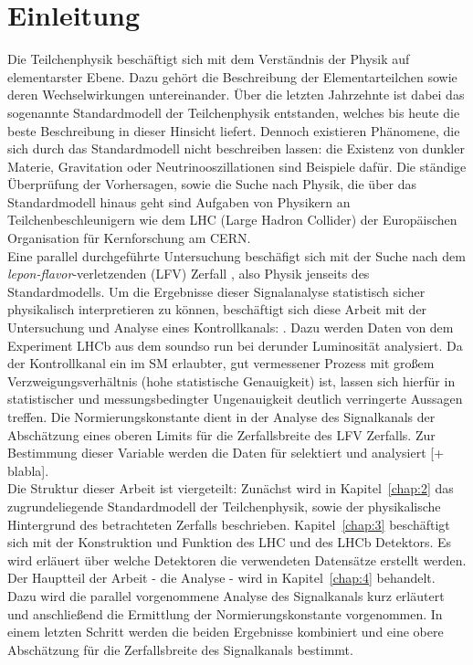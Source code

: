\chapter{Einleitung}

Die Teilchenphysik beschäftigt sich mit dem Verständnis der Physik auf elementarster Ebene. Dazu gehört die Beschreibung der Elementarteilchen sowie deren Wechselwirkungen untereinander. Über die letzten Jahrzehnte ist dabei das sogenannte Standardmodell der Teilchenphysik entstanden, welches bis heute die beste Beschreibung in dieser Hinsicht liefert. Dennoch existieren Phänomene, die sich durch das Standardmodell nicht beschreiben lassen: die Existenz von dunkler Materie, Gravitation oder Neutrinooszillationen sind Beispiele dafür. Die ständige Überprüfung der Vorhersagen, sowie die Suche nach Physik, die über das Standardmodell hinaus geht sind Aufgaben von Physikern an Teilchenbeschleunigern wie dem LHC (Large Hadron Collider) der Europäischen Organisation für Kernforschung am CERN. \\
Eine parallel durchgeführte Untersuchung beschäfigt sich mit der Suche nach dem \textit{lepon-flavor}-verletzenden (LFV) Zerfall \signal, also Physik jenseits des Standardmodells\cite{ba-maik}. Um die Ergebnisse dieser Signalanalyse statistisch sicher physikalisch interpretieren zu können, beschäftigt sich diese Arbeit mit der Untersuchung und Analyse eines Kontrollkanals: \kontroll.
Dazu werden Daten von dem Experiment LHCb aus dem soundso run bei derunder Luminosität analysiert. Da der Kontrollkanal ein im SM erlaubter, gut vermessener Prozess mit großem Verzweigungsverhältnis (hohe statistische Genauigkeit) ist, lassen sich hierfür in statistischer und messungsbedingter Ungenauigkeit deutlich verringerte Aussagen treffen. Die Normierungskonstante dient in der Analyse des Signalkanals der Abschätzung eines oberen Limits für die Zerfallsbreite des LFV Zerfalls. Zur Bestimmung dieser Variable werden die Daten für \kontroll selektiert und analysiert [+ blabla]. \cite{ba-maik}\\
Die Struktur dieser Arbeit ist viergeteilt: Zunächst wird in Kapitel~\ref{chap:2} das zugrundeliegende Standardmodell der Teilchenphysik, sowie der physikalische Hintergrund des betrachteten Zerfalls beschrieben. Kapitel~\ref{chap:3} beschäftigt sich mit der Konstruktion und Funktion des LHC und des LHCb Detektors. Es wird erläuert über welche Detektoren die verwendeten Datensätze erstellt werden. Der Hauptteil der Arbeit - die Analyse - wird in Kapitel~\ref{chap:4} behandelt. Dazu wird die parallel vorgenommene Analyse des Signalkanals \signal kurz erläutert und anschließend die Ermittlung der Normierungskonstante vorgenommen. In einem letzten Schritt werden die beiden Ergebnisse kombiniert und eine obere Abschätzung für die Zerfallsbreite des Signalkanals bestimmt.
